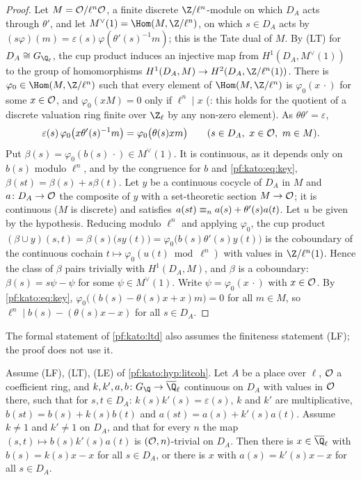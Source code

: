 \begin{proof}
Let $M=\mathcal{O}/\ell^n\mathcal{O}$, a finite discrete $\Z/\ell^n$-module on which $D_A$ acts through $\theta'$, and let
$M^\vee(1)=\Hom(M,\Z/\ell^n)$, on which $s\in D_A$ acts by $(s\varphi)(m)=\varepsilon(s)\varphi(\theta'(s)^{-1}m)$; this is the Tate dual
of $M$. By (LT) for $D_A\cong G_{\Q_\ell}$, the cup product induces an injective map from $H^1(D_A,M^\vee(1))$ to the group of
homomorphisms $H^1(D_A,M)\to H^2(D_A,\Z/\ell^n(1))$. There is $\varphi_0\in\Hom(M,\Z/\ell^n)$ such that every element of
$\Hom(M,\Z/\ell^n)$ is $\varphi_0(x\,\cdot)$ for some $x\in\mathcal{O}$, and $\varphi_0(xM)=0$ only if $\ell^n\mid x$
(: this holds for the quotient of a discrete valuation ring finite over $\Z_\ell$ by any non-zero
element). As $\theta\theta'=\varepsilon$,
\begin{equation}\label{pf:kato:eq:key}
  \varepsilon(s)\,\varphi_0\bigl(x\theta'(s)^{-1}m\bigr)=\varphi_0\bigl(\theta(s)xm\bigr)\qquad(s\in D_A,\ x\in\mathcal{O},\ m\in M).
\end{equation}
Put $\beta(s)=\varphi_0(b(s)\,\cdot)\in M^\vee(1)$. It is continuous, as it depends only on $b(s)$ modulo $\ell^n$, and by the congruence
for $b$ and \eqref{pf:kato:eq:key}, $\beta(st)=\beta(s)+s\beta(t)$. Let $y$ be a continuous cocycle of $D_A$ in $M$ and $a\colon
D_A\to\mathcal{O}$ the composite of $y$ with a set-theoretic section $M\to\mathcal{O}$; it is continuous ($M$ is discrete) and satisfies
$a(st)\equiv_{n}a(s)+\theta'(s)a(t)$. Let $u$ be given by the hypothesis. Reducing modulo $\ell^n$ and applying $\varphi_0$, the
cup product $(\beta\cup y)(s,t)=\beta(s)\bigl(sy(t)\bigr)=\varphi_0\bigl(b(s)\theta'(s)y(t)\bigr)$ is the coboundary of the continuous
cochain $t\mapsto\varphi_0(u(t)\bmod\ell^n)$ with values in $\Z/\ell^n(1)$. Hence the class of $\beta$ pairs trivially with
$H^1(D_A,M)$, and $\beta$ is a coboundary: $\beta(s)=s\psi-\psi$ for some $\psi\in M^\vee(1)$. Write $\psi=\varphi_0(x\,\cdot)$ with
$x\in\mathcal{O}$. By \eqref{pf:kato:eq:key}, $\varphi_0\bigl((b(s)-\theta(s)x+x)m\bigr)=0$ for all $m\in M$, so
$\ell^n\mid b(s)-(\theta(s)x-x)$ for all $s\in D_A$.
\end{proof}

The formal statement of \cref{pf:kato:ltd} also assumes the finiteness statement (LF); the proof does not use it.

\begin{lemma}\label{pf:kato:locdual}
Assume (LF), (LT), (LE) of \cref{pf:kato:hyp:litcoh}. Let $A$ be a place over $\ell$, $\mathcal{O}$ a coefficient ring, and
$k,k',a,b\colon G_\Q\to\katoQlb$ continuous on $D_A$ with values in $\mathcal{O}$ there, such that for $s,t\in D_A$:
$k(s)k'(s)=\varepsilon(s)$, $k$ and $k'$ are multiplicative, $b(st)=b(s)+k(s)b(t)$ and $a(st)=a(s)+k'(s)a(t)$. Assume $k\ne1$ and $k'\ne1$
on $D_A$, and that for every $n$ the map $(s,t)\mapsto b(s)k'(s)a(t)$ is $(\mathcal{O},n)$-trivial on $D_A$. Then there is $x\in\katoQlb$ with
$b(s)=k(s)x-x$ for all $s\in D_A$, or there is $x$ with $a(s)=k'(s)x-x$ for all $s\in D_A$.
\end{lemma}

